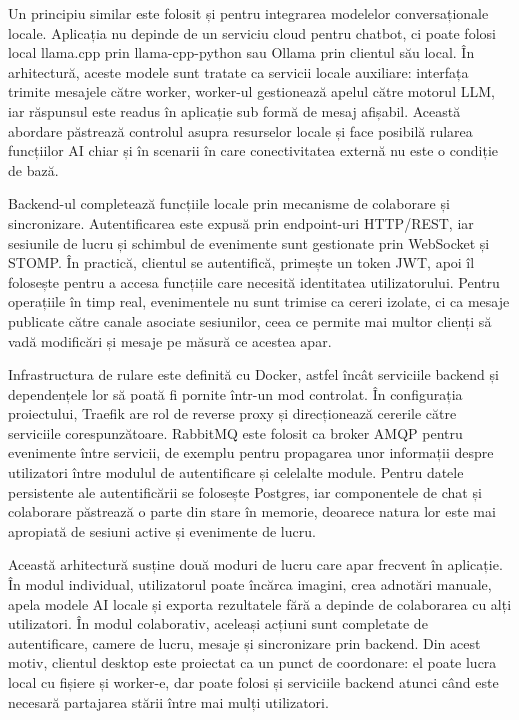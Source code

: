 Un principiu similar este folosit și pentru integrarea modelelor conversaționale locale. Aplicația nu depinde de un serviciu cloud pentru chatbot, ci poate folosi local llama.cpp prin llama-cpp-python sau Ollama prin clientul său local. În arhitectură, aceste modele sunt tratate ca servicii locale auxiliare: interfața trimite mesajele către worker, worker-ul gestionează apelul către motorul LLM, iar răspunsul este readus în aplicație sub formă de mesaj afișabil. Această abordare păstrează controlul asupra resurselor locale și face posibilă rularea funcțiilor AI chiar și în scenarii în care conectivitatea externă nu este o condiție de bază.

Backend-ul completează funcțiile locale prin mecanisme de colaborare și sincronizare. Autentificarea este expusă prin endpoint-uri HTTP/REST, iar sesiunile de lucru și schimbul de evenimente sunt gestionate prin WebSocket și STOMP. În practică, clientul se autentifică, primește un token JWT, apoi îl folosește pentru a accesa funcțiile care necesită identitatea utilizatorului. Pentru operațiile în timp real, evenimentele nu sunt trimise ca cereri izolate, ci ca mesaje publicate către canale asociate sesiunilor, ceea ce permite mai multor clienți să vadă modificări și mesaje pe măsură ce acestea apar.

Infrastructura de rulare este definită cu Docker, astfel încât serviciile backend și dependențele lor să poată fi pornite într-un mod controlat. În configurația proiectului, Traefik are rol de reverse proxy și direcționează cererile către serviciile corespunzătoare. RabbitMQ este folosit ca broker AMQP pentru evenimente între servicii, de exemplu pentru propagarea unor informații despre utilizatori între modulul de autentificare și celelalte module. Pentru datele persistente ale autentificării se folosește Postgres, iar componentele de chat și colaborare păstrează o parte din stare în memorie, deoarece natura lor este mai apropiată de sesiuni active și evenimente de lucru.

Această arhitectură susține două moduri de lucru care apar frecvent în aplicație. În modul individual, utilizatorul poate încărca imagini, crea adnotări manuale, apela modele AI locale și exporta rezultatele fără a depinde de colaborarea cu alți utilizatori. În modul colaborativ, aceleași acțiuni sunt completate de autentificare, camere de lucru, mesaje și sincronizare prin backend. Din acest motiv, clientul desktop este proiectat ca un punct de coordonare: el poate lucra local cu fișiere și worker-e, dar poate folosi și serviciile backend atunci când este necesară partajarea stării între mai mulți utilizatori.

